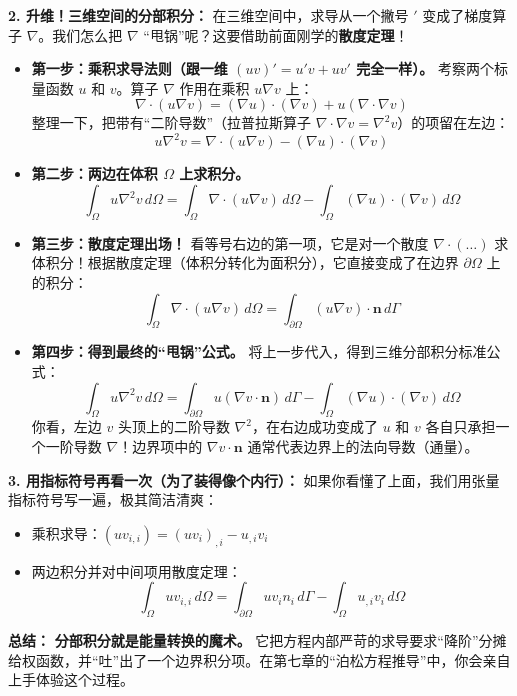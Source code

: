 \documentclass[11pt, a4paper, UTF8]{ctexart}
\begin{document}
\textbf{2. 升维！三维空间的分部积分：}
在三维空间中，求导从一个撇号 $'$ 变成了梯度算子 $\nabla$。我们怎么把 $\nabla$ “甩锅”呢？这要借助前面刚学的\textbf{散度定理}！
\begin{itemize}
    \item \textbf{第一步：乘积求导法则（跟一维 $(uv)'=u'v+uv'$ 完全一样）。} 
    考察两个标量函数 $u$ 和 $v$。算子 $\nabla$ 作用在乘积 $u \nabla v$ 上：
    \[ \nabla \cdot (u \nabla v) = (\nabla u) \cdot (\nabla v) + u (\nabla \cdot \nabla v) \]
    整理一下，把带有“二阶导数”（拉普拉斯算子 $\nabla \cdot \nabla v = \nabla^2 v$）的项留在左边：
    \[ u \nabla^2 v = \nabla \cdot (u \nabla v) - (\nabla u) \cdot (\nabla v) \]
    \item \textbf{第二步：两边在体积 $\Omega$ 上求积分。}
    \[ \int_{\Omega} u \nabla^2 v \, d\Omega = \int_{\Omega} \nabla \cdot (u \nabla v) \, d\Omega - \int_{\Omega} (\nabla u) \cdot (\nabla v) \, d\Omega \]
    \item \textbf{第三步：散度定理出场！}
    看等号右边的第一项，它是对一个散度 $\nabla \cdot (\dots)$ 求体积分！根据散度定理（体积分转化为面积分），它直接变成了在边界 $\partial\Omega$ 上的积分：
    \[ \int_{\Omega} \nabla \cdot (u \nabla v) \, d\Omega = \int_{\partial\Omega} (u \nabla v) \cdot \bm{n} \, d\Gamma \]
    \item \textbf{第四步：得到最终的“甩锅”公式。} 将上一步代入，得到三维分部积分标准公式：
    \[ \int_{\Omega} u \nabla^2 v \, d\Omega = \int_{\partial\Omega} u (\nabla v \cdot \bm{n}) \, d\Gamma - \int_{\Omega} (\nabla u) \cdot (\nabla v) \, d\Omega \]
    你看，左边 $v$ 头顶上的二阶导数 $\nabla^2$，在右边成功变成了 $u$ 和 $v$ 各自只承担一个一阶导数 $\nabla$！边界项中的 $\nabla v \cdot \bm{n}$ 通常代表边界上的法向导数（通量）。
\end{itemize}

\textbf{3. 用指标符号再看一次（为了装得像个内行）：}
如果你看懂了上面，我们用张量指标符号写一遍，极其简洁清爽：
\begin{itemize}
    \item 乘积求导：$(u v_{i,i}) = (u v_i)_{,i} - u_{,i} v_i$
    \item 两边积分并对中间项用散度定理：
    \[ \int_{\Omega} u v_{i,i} \, d\Omega = \int_{\partial\Omega} u v_i n_i \, d\Gamma - \int_{\Omega} u_{,i} v_i \, d\Omega \]
\end{itemize}

\textbf{总结：} \textbf{分部积分就是能量转换的魔术。} 它把方程内部严苛的求导要求“降阶”分摊给权函数，并“吐”出了一个边界积分项。在第七章的“泊松方程推导”中，你会亲自上手体验这个过程。
\end{document}
